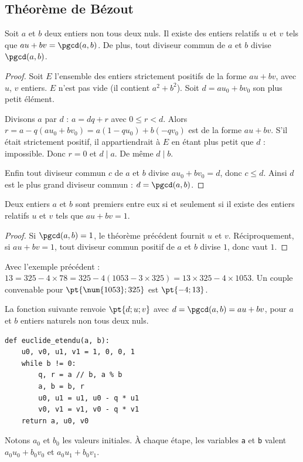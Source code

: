 \subsection{Théorème de Bézout}
\begin{theorem}
Soit $a$ et $b$ deux entiers non tous deux nuls. Il existe des entiers relatifs $u$ et $v$ tels que $au+bv=\pgcd(a,b)$. De plus, tout diviseur commun de $a$ et $b$ divise $\pgcd(a,b)$.
\end{theorem}
\begin{proof}
Soit $E$ l'ensemble des entiers strictement positifs de la forme $au+bv$, avec $u$, $v$ entiers. $E$ n'est pas vide (il contient $a^2+b^2$). Soit $d=au_0+bv_0$ son plus petit élément.\par
Divisons $a$ par $d$ : $a=dq+r$ avec $0\le r<d$. Alors $r=a-q(au_0+bv_0)=a(1-qu_0)+b(-qv_0)$ est de la forme $au+bv$. S'il était strictement positif, il appartiendrait à $E$ en étant plus petit que $d$ : impossible. Donc $r=0$ et $d\mid a$. De même $d\mid b$.\par
Enfin tout diviseur commun $c$ de $a$ et $b$ divise $au_0+bv_0=d$, donc $c\le d$. Ainsi $d$ est le plus grand diviseur commun : $d=\pgcd(a,b)$.
\end{proof}
\begin{theorem}
Deux entiers $a$ et $b$ sont premiers entre eux si et seulement si il existe des entiers relatifs $u$ et $v$ tels que $au+bv=1$.
\end{theorem}
\begin{proof}
Si $\pgcd(a,b)=1$, le théorème précédent fournit $u$ et $v$. Réciproquement, si $au+bv=1$, tout diviseur commun positif de $a$ et $b$ divise $1$, donc vaut $1$.
\end{proof}
\begin{method}
Avec l'exemple précédent : $13=325-4\times78=325-4(\num{1053}-3\times325)=13\times325-4\times\num{1053}$. Un couple convenable pour $\pt{\num{1053};325}$ est $\pt{-4;13}$.
\end{method}
\begin{keypoint}
La fonction suivante renvoie $\pt{d;u;v}$ avec $d=\pgcd(a,b)=au+bv$, pour $a$ et $b$ entiers naturels non tous deux nuls.
\begin{lstlisting}
def euclide_etendu(a, b):
    u0, v0, u1, v1 = 1, 0, 0, 1
    while b != 0:
        q, r = a // b, a % b
        a, b = b, r
        u0, u1 = u1, u0 - q * u1
        v0, v1 = v1, v0 - q * v1
    return a, u0, v0
\end{lstlisting}
Notons $a_0$ et $b_0$ les valeurs initiales. À chaque étape, les variables \texttt{a} et \texttt{b} valent $a_0u_0+b_0v_0$ et $a_0u_1+b_0v_1$.
\end{keypoint}

